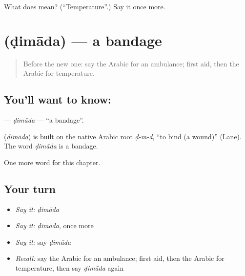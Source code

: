 \begin{tcolorbox}[breakable,colback=teal!4,colframe=teal!35!black,title={Before you move on}]
What does  mean? (\textquotedblleft{}Temperature\textquotedblright{}.) Say it once more.
\end{tcolorbox}
\section[\texorpdfstring{\ar{ضمادة} (ḍimāda)}{ضمادة (ḍimāda)}]{ (ḍimāda) — a bandage}

\label{lesson:AR-C262-dimada}



\begin{quote}
Before the new one: say the Arabic for an ambulance; first aid, then the Arabic for temperature.
\end{quote}

\subsection*{You'll want to know: }
\textbf{} — \emph{ḍimāda} — \textquotedblleft{}a bandage\textquotedblright{}.

\begin{cousinweb}
\textbf{} (\emph{ḍimāda}) is built on the native Arabic root \emph{ḍ-m-d}, \textquotedblleft{}to bind (a wound)\textquotedblright{} (Lane). The word \emph{ḍimāda} is a bandage.
\end{cousinweb}

\begin{grammarlens}[title={What you've built}]
One more word for this chapter.
\end{grammarlens}

\subsection*{Your turn}
\begin{itemize}
\raggedright
  \item \emph{Say it:} \emph{ḍimāda}
  \item \emph{Say it:} \emph{ḍimāda}, once more
  \item \emph{Say it:} say \emph{ḍimāda}
  \item \emph{Recall:} say the Arabic for an ambulance; first aid, then the Arabic for temperature, then say \emph{ḍimāda} again
\end{itemize}

